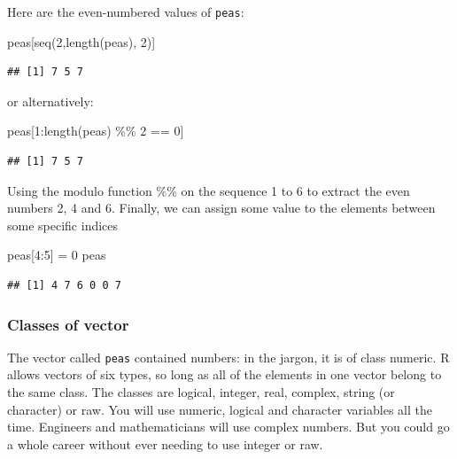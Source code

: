 \documentclass[
]{book}
\newenvironment{Shaded}{\begin{snugshade}}{\end{snugshade}}
\newcommand{\DecValTok}[1]{\textcolor[rgb]{0.00,0.00,0.81}{#1}}
\newcommand{\FunctionTok}[1]{\textcolor[rgb]{0.00,0.00,0.00}{#1}}
\newcommand{\NormalTok}[1]{#1}
\newcommand{\OtherTok}[1]{\textcolor[rgb]{0.56,0.35,0.01}{#1}}
\newcommand{\SpecialCharTok}[1]{\textcolor[rgb]{0.00,0.00,0.00}{#1}}
\begin{document}
Here are the even-numbered values of \texttt{peas}:

\begin{Shaded}
\begin{Highlighting}[]
\NormalTok{peas[}\FunctionTok{seq}\NormalTok{(}\DecValTok{2}\NormalTok{,}\FunctionTok{length}\NormalTok{(peas), }\DecValTok{2}\NormalTok{)]}
\end{Highlighting}
\end{Shaded}

\begin{verbatim}
## [1] 7 5 7
\end{verbatim}

or alternatively:

\begin{Shaded}
\begin{Highlighting}[]
\NormalTok{peas[}\DecValTok{1}\SpecialCharTok{:}\FunctionTok{length}\NormalTok{(peas) }\SpecialCharTok{\%\%} \DecValTok{2} \SpecialCharTok{==} \DecValTok{0}\NormalTok{]}
\end{Highlighting}
\end{Shaded}

\begin{verbatim}
## [1] 7 5 7
\end{verbatim}

Using the modulo function \%\% on the sequence 1 to 6 to extract the even numbers 2, 4 and 6. Finally, we can assign some value to the elements between some specific indices

\begin{Shaded}
\begin{Highlighting}[]
\NormalTok{peas[}\DecValTok{4}\SpecialCharTok{:}\DecValTok{5}\NormalTok{] }\OtherTok{=} \DecValTok{0}
\NormalTok{peas}
\end{Highlighting}
\end{Shaded}

\begin{verbatim}
## [1] 4 7 6 0 0 7
\end{verbatim}

\hypertarget{classes-of-vector}{%
\subsubsection{Classes of vector}\label{classes-of-vector}}

The vector called \texttt{peas} contained numbers: in the jargon, it is of class numeric. R allows vectors of six types, so long as all of the elements in one vector belong to the same class. The classes are logical, integer, real, complex, string (or character) or raw. You will use numeric, logical and character variables all the time. Engineers and mathematicians will use complex numbers. But you could go a whole career without ever needing to use integer or raw.
\end{document}
